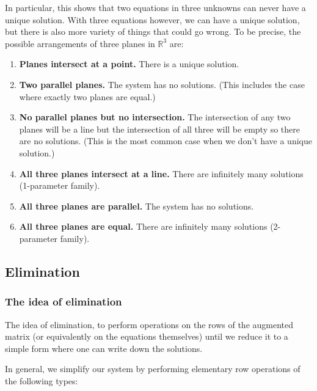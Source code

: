 \documentclass[12pt, a4paper]{article}
\theoremstyle{definition}
\theoremstyle{plain}
\newcommand{\bb}[1]{\mathbb{#1}}
\begin{document}
In particular, this shows that two equations in three unknowns can never have a unique solution. With three equations however, we can have a unique solution, but there is also more variety of things that could go wrong. To be precise, the possible arrangements of three planes in $\bb{R}^3$ are:

\begin{enumerate}

	\item \textbf{Planes intersect at a point.} There is a unique solution.

	\item \textbf{Two parallel planes.} The system has no solutions. (This includes the case where exactly two planes are equal.)

	\item \textbf{No parallel planes but no intersection.} The intersection of any two planes will be a line but the intersection of all three will be empty so there are no solutions. (This is the most common case when we don’t have a unique solution.)

	\item \textbf{All three planes intersect at a line.} There are infinitely many solutions (1-parameter family).

	\item \textbf{All three planes are parallel.} The system has no solutions.

	\item \textbf{All three planes are equal.} There are infinitely many solutions (2-parameter family).

\end{enumerate}

\subsection{Elimination}

\subsubsection{The idea of elimination}

The idea of elimination, to perform operations on the rows of the augmented matrix (or equivalently on the equations themselves) until we reduce it to a simple form where one can write down the solutions.

In general, we simplify our system by performing elementary row operations of the following types:
\end{document}
